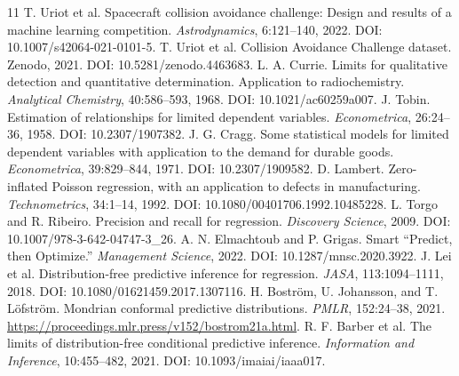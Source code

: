 \documentclass[10pt]{article}
\begin{document}
\begin{thebibliography}{11}
 T. Uriot et al. Spacecraft collision avoidance challenge: Design and results of a machine learning competition. \emph{Astrodynamics}, 6:121--140, 2022. DOI: 10.1007/s42064-021-0101-5.
 T. Uriot et al. Collision Avoidance Challenge dataset. Zenodo, 2021. DOI: 10.5281/zenodo.4463683.
 L. A. Currie. Limits for qualitative detection and quantitative determination. Application to radiochemistry. \emph{Analytical Chemistry}, 40:586--593, 1968. DOI: 10.1021/ac60259a007.
 J. Tobin. Estimation of relationships for limited dependent variables. \emph{Econometrica}, 26:24--36, 1958. DOI: 10.2307/1907382.
 J. G. Cragg. Some statistical models for limited dependent variables with application to the demand for durable goods. \emph{Econometrica}, 39:829--844, 1971. DOI: 10.2307/1909582.
 D. Lambert. Zero-inflated Poisson regression, with an application to defects in manufacturing. \emph{Technometrics}, 34:1--14, 1992. DOI: 10.1080/00401706.1992.10485228.
 L. Torgo and R. Ribeiro. Precision and recall for regression. \emph{Discovery Science}, 2009. DOI: 10.1007/978-3-642-04747-3\_26.
 A. N. Elmachtoub and P. Grigas. Smart ``Predict, then Optimize.'' \emph{Management Science}, 2022. DOI: 10.1287/mnsc.2020.3922.
 J. Lei et al. Distribution-free predictive inference for regression. \emph{JASA}, 113:1094--1111, 2018. DOI: 10.1080/01621459.2017.1307116.
 H. Bostr\"om, U. Johansson, and T. L\"ofstr\"om. Mondrian conformal predictive distributions. \emph{PMLR}, 152:24--38, 2021. \url{https://proceedings.mlr.press/v152/bostrom21a.html}.
 R. F. Barber et al. The limits of distribution-free conditional predictive inference. \emph{Information and Inference}, 10:455--482, 2021. DOI: 10.1093/imaiai/iaaa017.
\end{thebibliography}
\end{document}
